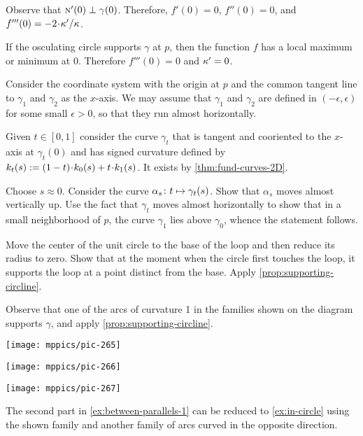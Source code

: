 \begin{multicols}{2}
Observe that $\text{\sc{n}}'(0)\perp\gamma(0)$.
Therefore, $f'(0)=0$, $f''(0)=0$, and $f'''(0)\z=-2\cdot\kur'/\kur$.

If the osculating circle supports $\gamma$ at $p$,
then the function $f$ has a local maximum or minimum at $0$.
Therefore $f'''(0)=0$ and $\kappa'=0$.

Consider the coordinate system with the origin at $p$ and the common tangent line to $\gamma_1$ and $\gamma_2$ as the $x$-axis.
We may assume that $\gamma_1$ and $\gamma_2$ are defined in $(-\epsilon,\epsilon)$ for some small $\epsilon>0$,
so that they run almost horizontally.

Given $t\in[0,1]$ consider the curve $\gamma_t$ that is tangent and cooriented to the $x$-axis at $\gamma_t(0)$ and has signed curvature defined by $\skur_t(s)\z\df(1\z-t)\cdot\skur_0(s)+t\cdot\skur_1(s)$.
It exists by \ref{thm:fund-curves-2D}.

Choose $s\approx 0$.
Consider the curve $\alpha_s\:t\z\mapsto \gamma_t(s)$.
Show that $\alpha_s$ moves almost vertically up.
Use the fact that $\gamma_t$ moves almost horizontally to show that in a small neighborhood of $p$, the curve $\gamma_1$ lies above $\gamma_0$,
whence the statement follows.

 Move the center of the unit circle to the base of the loop and then reduce its radius to zero.
Show that at the moment when the circle first touches the loop, it supports the loop at a point distinct from the base.
Apply \ref{prop:supporting-circline}.


Observe that one of the arcs of curvature 1 in the families shown on the diagram supports $\gamma$, and apply \ref{prop:supporting-circline}.

\begin{Figure}
\begin{minipage}{.35\textwidth}
\centering
\texttt{[image: mppics/pic-265]}
\end{minipage}
\hfill
\begin{minipage}{.3\textwidth}
\centering
\texttt{[image: mppics/pic-266]}
\end{minipage}
\hfill
\begin{minipage}{.25\textwidth}
\centering
\texttt{[image: mppics/pic-267]}
\end{minipage}
\end{Figure}

The second part in \ref{ex:between-parallels-1} can be reduced to \ref{ex:in-circle} using the shown family and another family of arcs curved in the opposite direction.


\end{multicols}
